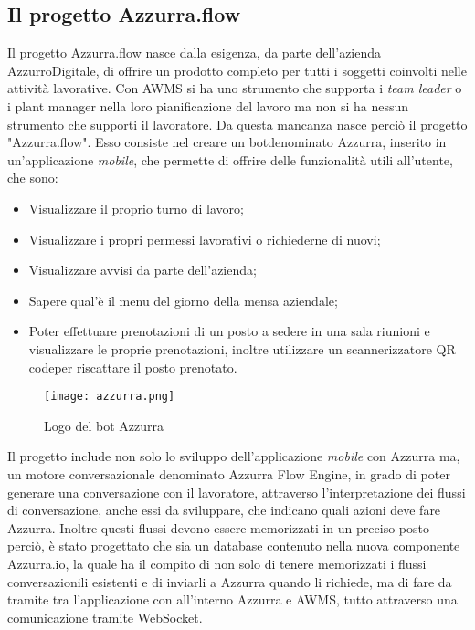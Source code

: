 \subsection{Il progetto Azzurra.flow}

Il progetto Azzurra.flow nasce dalla esigenza, da parte dell'azienda AzzurroDigitale, di offrire un prodotto completo per tutti i soggetti coinvolti nelle attività lavorative. Con \gls{AWMS} si ha uno strumento che supporta i \emph{team leader} o i \gls{plant manager}\ap{[g]} nella loro pianificazione del lavoro ma non si ha nessun strumento che supporti il lavoratore. Da questa mancanza nasce perciò il progetto "Azzurra.flow". Esso consiste nel creare un \gls{bot}\glsfirstoccur denominato Azzurra, inserito in un’applicazione \emph{mobile}, che permette di offrire delle funzionalità utili all'utente, che sono:
\begin{itemize}
	\item Visualizzare il proprio turno di lavoro;
	\item Visualizzare i propri permessi lavorativi o richiederne di nuovi;
	\item Visualizzare avvisi da parte dell'azienda;
	\item Sapere qual'è il menu del giorno della mensa aziendale;
	\item Poter effettuare prenotazioni di un posto a sedere in una sala riunioni e visualizzare le proprie prenotazioni, inoltre utilizzare un scannerizzatore \gls{QR code}\glsfirstoccur per riscattare il posto prenotato.
\end{itemize}
\begin{figure}[!h] 
	\begin{center}
		\texttt{[image: azzurra.png]}
		\caption{Logo del bot Azzurra}
	\end{center}
\end{figure}
Il progetto include non solo lo sviluppo dell'applicazione \emph{mobile} con Azzurra ma, un motore conversazionale denominato Azzurra Flow Engine, in grado di poter generare una conversazione con il lavoratore, attraverso l'interpretazione dei flussi di conversazione, anche essi da sviluppare, che indicano quali azioni deve fare Azzurra. Inoltre questi flussi devono essere memorizzati in un preciso posto perciò, è stato progettato che sia un \gls{database}\ap{[g]} contenuto nella nuova componente Azzurra.io, la quale ha il compito di non solo di tenere memorizzati i flussi conversazionili esistenti e di inviarli a Azzurra quando li richiede, ma di fare da tramite tra l'applicazione con all'interno Azzurra e \gls{AWMS}, tutto attraverso una comunicazione tramite \gls{WebSocket}\glsfirstoccur.
